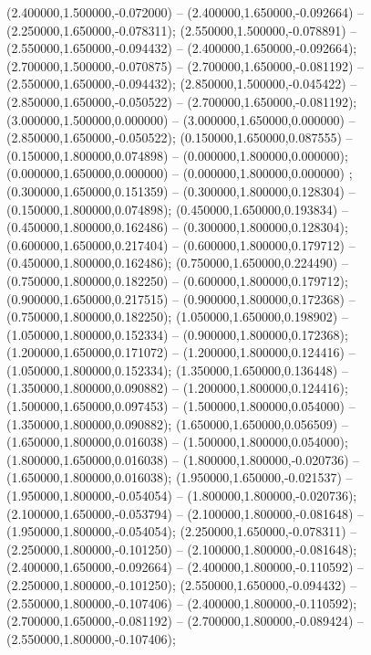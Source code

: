  (2.400000,1.500000,-0.072000) -- (2.400000,1.650000,-0.092664) -- (2.250000,1.650000,-0.078311);
 (2.550000,1.500000,-0.078891) -- (2.550000,1.650000,-0.094432) -- (2.400000,1.650000,-0.092664);
 (2.700000,1.500000,-0.070875) -- (2.700000,1.650000,-0.081192) -- (2.550000,1.650000,-0.094432);
 (2.850000,1.500000,-0.045422) -- (2.850000,1.650000,-0.050522) -- (2.700000,1.650000,-0.081192);
 (3.000000,1.500000,0.000000) -- (3.000000,1.650000,0.000000) -- (2.850000,1.650000,-0.050522);
 (0.150000,1.650000,0.087555) -- (0.150000,1.800000,0.074898) -- (0.000000,1.800000,0.000000);
 (0.000000,1.650000,0.000000) -- (0.000000,1.800000,0.000000) ;
 (0.300000,1.650000,0.151359) -- (0.300000,1.800000,0.128304) -- (0.150000,1.800000,0.074898);
 (0.450000,1.650000,0.193834) -- (0.450000,1.800000,0.162486) -- (0.300000,1.800000,0.128304);
 (0.600000,1.650000,0.217404) -- (0.600000,1.800000,0.179712) -- (0.450000,1.800000,0.162486);
 (0.750000,1.650000,0.224490) -- (0.750000,1.800000,0.182250) -- (0.600000,1.800000,0.179712);
 (0.900000,1.650000,0.217515) -- (0.900000,1.800000,0.172368) -- (0.750000,1.800000,0.182250);
 (1.050000,1.650000,0.198902) -- (1.050000,1.800000,0.152334) -- (0.900000,1.800000,0.172368);
 (1.200000,1.650000,0.171072) -- (1.200000,1.800000,0.124416) -- (1.050000,1.800000,0.152334);
 (1.350000,1.650000,0.136448) -- (1.350000,1.800000,0.090882) -- (1.200000,1.800000,0.124416);
 (1.500000,1.650000,0.097453) -- (1.500000,1.800000,0.054000) -- (1.350000,1.800000,0.090882);
 (1.650000,1.650000,0.056509) -- (1.650000,1.800000,0.016038) -- (1.500000,1.800000,0.054000);
 (1.800000,1.650000,0.016038) -- (1.800000,1.800000,-0.020736) -- (1.650000,1.800000,0.016038);
 (1.950000,1.650000,-0.021537) -- (1.950000,1.800000,-0.054054) -- (1.800000,1.800000,-0.020736);
 (2.100000,1.650000,-0.053794) -- (2.100000,1.800000,-0.081648) -- (1.950000,1.800000,-0.054054);
 (2.250000,1.650000,-0.078311) -- (2.250000,1.800000,-0.101250) -- (2.100000,1.800000,-0.081648);
 (2.400000,1.650000,-0.092664) -- (2.400000,1.800000,-0.110592) -- (2.250000,1.800000,-0.101250);
 (2.550000,1.650000,-0.094432) -- (2.550000,1.800000,-0.107406) -- (2.400000,1.800000,-0.110592);
 (2.700000,1.650000,-0.081192) -- (2.700000,1.800000,-0.089424) -- (2.550000,1.800000,-0.107406);

